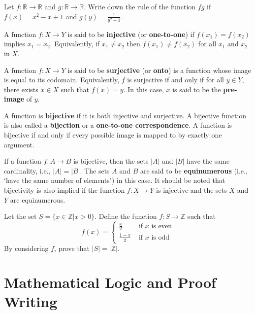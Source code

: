 \begin{exercise}
    Let $f: \mathbb{R} \to \mathbb{R}$ and $g: \mathbb{R} \to \mathbb{R}$. Write down the rule of the function $fg$ if $f(x) = x^2 - x + 1$ and $g(y) = \frac1{y^2+1}$.
\end{exercise}

A function $f: X \to Y$ is said to be \textbf{injective} (or \textbf{one-to-one}) if $f(x_1) = f(x_2)$ implies $x_1 = x_2$. Equivalently, if $x_1 \neq x_2$ then $f(x_1) \neq f(x_2)$ for all $x_1$ and $x_2$ in $X$.

A function $f: X \to Y$ is said to be \textbf{surjective} (or \textbf{onto}) is a function whose image is equal to its codomain. Equivalently, $f$ is surjective if and only if for all $y \in Y$, there exists $x \in X$ such that $f(x) = y$. In this case, $x$ is said to be the \textbf{pre-image} of $y$.

A function is \textbf{bijective} if it is both injective and surjective. A bijective function is also called a \textbf{bijection} or a \textbf{one-to-one correspondence}. A function is bijective if and only if every possible image is mapped to by exactly one argument.

If a function $f: A \to B$ is bijective, then the sets $|A|$ and $|B|$ have the same cardinality, i.e., $|A| = |B|$. The sets $A$ and $B$ are said to be \textbf{equinumerous} (i.e., `have the same number of elements') in this case. It should be noted that bijectivity is also implied if the function $f: X \to Y$ is injective and the sets $X$ and $Y$ are equinumerous.

\begin{exercise}
    Let the set $S = \{x \in \mathbb{Z} \vert x > 0\}$. Define the function $f: S \to \mathbb{Z}$ such that
    \[
        f(x) = \begin{cases}
            \frac{x}{2} & \text{ if } x \text{ is even}\\
            \frac{1-x}{2} & \text{ if } x \text{ is odd} 
        \end{cases}
    \]
    By considering $f$, prove that $|S| = |\mathbb{Z}|$.
\end{exercise}

\chapter{Mathematical Logic and Proof Writing}
